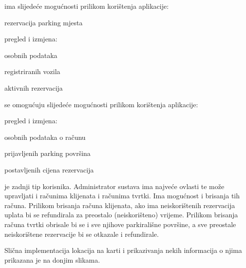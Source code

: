 		\noindent {} ima slijedeće mogućnosti prilikom korištenja aplikacije:
		
		\begin{packed_item}
			\item rezervacija parking mjesta
			\item pregled i izmjena:
			\begin{packed_item}
				\item osobnih podataka
				\item registriranih vozila
				\item aktivnih rezervacija
			\end{packed_item}
		\end{packed_item}
			
		\noindent {} se omogućuju slijedeće mogućnosti prilikom korištenja aplikacije:
		
		\begin{packed_item}
			\item pregled i izmjena:
			\begin{packed_item}
				\item osobnih podataka o računu
				\item prijavljenih parking površina
				\item postavljenih cijena rezervacija
			\end{packed_item}
		\end{packed_item}
		
			
		\noindent {}			
		je zadnji tip korisnika. Administrator sustava ima najveće ovlasti te može upravljati i računima klijenata i računima tvrtki.
		Ima mogućnost i brisanja tih računa. 
		Prilikom brisanja računa klijenata, ako ima neiskorištenih rezervacija uplata bi se refundirala za preostalo (neiskorišteno) vrijeme. 
		Prilikom brisanja računa tvrtki obrisale bi se i sve njihove parkirališne površine, a sve preostale neiskorištene rezervacije bi se otkazale i refundirale.\\
		
		\clearpage
		
		Slična implementacija lokacija na karti i prikazivanja nekih informacija o njima prikazana je na donjim slikama.\\

